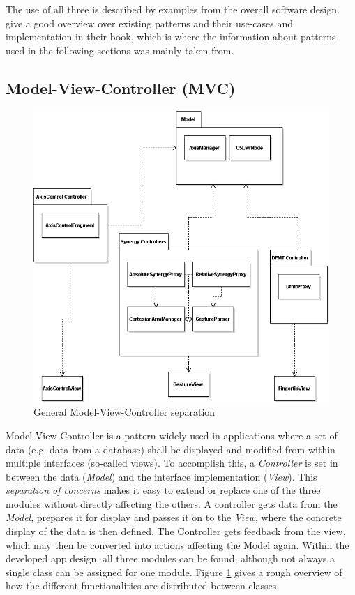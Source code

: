 The use of all three is described by examples from the overall software design. \citeauthor{Eilebrecht2013} \cite{Eilebrecht2013} give a good overview over existing patterns and their use-cases and implementation in their book, which is where the information about patterns used in the following sections was mainly taken from.

\subsection{Model-View-Controller (MVC)}

\begin{figure}
	\caption{\label{fig:conc:mvc}General Model-View-Controller separation}
	\includegraphics[width=\linewidth]{assets/chpt_concepts/sw/mvc.png}
\end{figure}

Model-View-Controller is a pattern widely used in applications where a set of data (e.g. data from a database) shall be displayed and modified from within multiple interfaces (so-called views)\cite{Eilebrecht2013}. To accomplish this, a \textit{Controller} is set in between the data (\textit{Model}) and the interface implementation (\textit{View}). This \textit{separation of concerns} makes it easy to extend or replace one of the three modules without directly affecting the others. A controller gets data from the \textit{Model}, prepares it for display and passes it on to the \textit{View}, where the concrete display of the data is then defined. The Controller gets feedback from the view, which may then be converted into actions affecting the Model again. Within the developed app design, all three modules can be found, although not always a single class can be assigned for one module. Figure \ref{fig:conc:mvc} gives a rough overview of how the different functionalities are distributed between classes.

